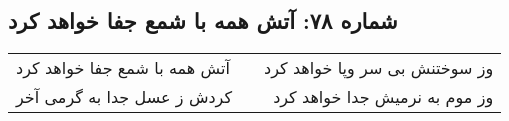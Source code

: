 \begin{center}
\section*{شماره ۷۸: آتش همه با شمع جفا خواهد کرد}
\label{sec:078}
\begin{longtable}{l p{0.5cm} r}
آتش همه با شمع جفا خواهد کرد
&&
وز سوختنش بی سر وپا خواهد کرد
\\
کردش ز عسل جدا به گرمی آخر
&&
وز موم به نرمیش جدا خواهد کرد
\\
\end{longtable}
\end{center}
